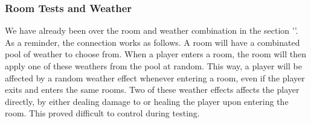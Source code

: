 \subsubsection{Room Tests and Weather} \label{roomTestsWeather}
We have already been over the room and weather combination in the section ''. As a reminder, the connection works as follows. A room will have a combinated pool of weather to choose from. When a player enters a room, the room will then apply one of these weathers from the pool at random. This way, a player will be affected by a random weather effect whenever entering a room, even if the player exits and enters the same rooms. Two of these weather effects affects the player directly, by either dealing damage to or healing the player upon entering the room. This proved difficult to control during testing. 


